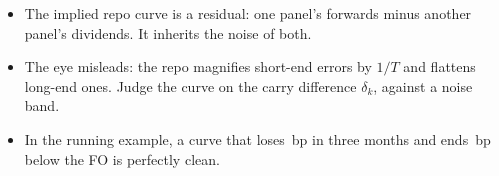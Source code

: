 \begin{retenir}
\begin{itemize}[leftmargin=12pt]
\item The implied repo curve is a residual: one panel's forwards minus another panel's dividends. It inherits the noise
of both.
\item The eye misleads: the repo magnifies short-end errors by $1/T$ and flattens long-end ones. Judge the curve on the
carry difference $\delta_k$, against a noise band.
\item In the running example, a curve that loses \vRunDrop\,bp in three months and ends \vRunGapLong\,bp below the FO
is perfectly clean.
\end{itemize}
\end{retenir}
